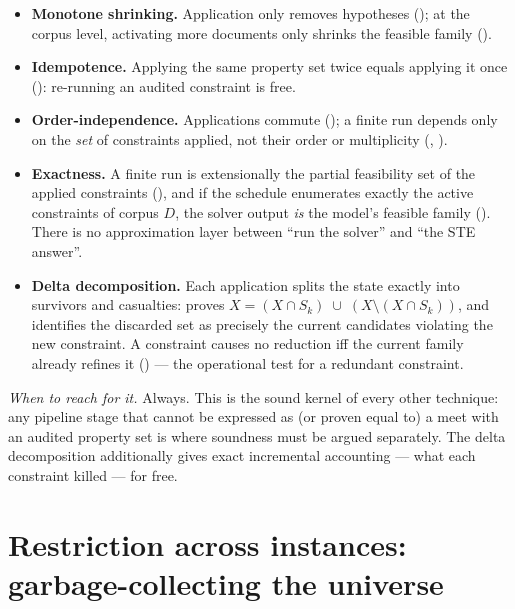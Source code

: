 \documentclass[11pt]{article}
\begin{document}
\begin{itemize}
\item \textbf{Monotone shrinking.}  Application only removes hypotheses
  (); at the corpus level, activating more
  documents only shrinks the feasible family
  ().
\item \textbf{Idempotence.}  Applying the same property set twice equals
  applying it once (): re-running an
  audited constraint is free.
\item \textbf{Order-independence.}  Applications commute
  (); a finite run depends only on the
  \emph{set} of constraints applied, not their order or multiplicity
  (, ).
\item \textbf{Exactness.}  A finite run is extensionally the partial
  feasibility set of the applied constraints
  (), and if the schedule
  enumerates exactly the active constraints of corpus $D$, the solver
  output \emph{is} the model's feasible family
  ().  There is no approximation layer between
  ``run the solver'' and ``the STE answer''.
\item \textbf{Delta decomposition.}  Each application splits the state
  exactly into survivors and casualties: 
  proves $X = (X\cap S_k)\;\cup\;(X\setminus(X\cap S_k))$, and
   identifies the discarded set as precisely
  the current candidates violating the new constraint.  A constraint
  causes no reduction iff the current family already refines it
  () --- the operational test for a
  redundant constraint.
\end{itemize}

\emph{When to reach for it.}  Always.  This is the sound kernel of every
other technique: any pipeline stage that cannot be expressed as (or
proven equal to) a meet with an audited property set is where soundness
must be argued separately.  The delta decomposition additionally gives
exact incremental accounting --- what each constraint killed --- for
free.

\section{Restriction across instances: garbage-collecting the universe}
\label{sec:restriction}
\end{document}
